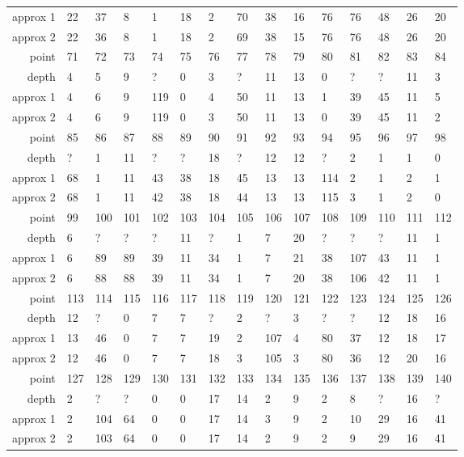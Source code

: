 \begin{center}
\begin{supertabular}{|r|l l l l l l l l l l l l l l|}
approx 1 & 22 & 37 & 8 & 1 & 18 & 2 & 70 & 38 & 16 & 76 & 76 & 48 & 26 & 20 \\
approx 2 & 22 & 36 & 8 & 1 & 18 & 2 & 69 & 38 & 15 & 76 & 76 & 48 & 26 & 20 \\
\hline
point & 71 & 72 & 73 & 74 & 75 & 76 & 77 & 78 & 79 & 80 & 81 & 82 & 83 & 84 \\
\hline
depth & 4 & 5 & 9 & ? & 0 & 3 & ? & 11 & 13 & 0 & ? & ? & 11 & 3 \\
approx 1 & 4 & 6 & 9 & 119 & 0 & 4 & 50 & 11 & 13 & 1 & 39 & 45 & 11 & 5 \\
approx 2 & 4 & 6 & 9 & 119 & 0 & 3 & 50 & 11 & 13 & 0 & 39 & 45 & 11 & 2 \\
\hline
point & 85 & 86 & 87 & 88 & 89 & 90 & 91 & 92 & 93 & 94 & 95 & 96 & 97 & 98 \\
\hline
depth & ? & 1 & 11 & ? & ? & 18 & ? & 12 & 12 & ? & 2 & 1 & 1 & 0 \\
approx 1 & 68 & 1 & 11 & 43 & 38 & 18 & 45 & 13 & 13 & 114 & 2 & 1 & 2 & 1 \\
approx 2 & 68 & 1 & 11 & 42 & 38 & 18 & 44 & 13 & 13 & 115 & 3 & 1 & 2 & 0 \\
\hline
point & 99 & 100 & 101 & 102 & 103 & 104 & 105 & 106 & 107 & 108 & 109 & 110 & 111 & 112 \\
\hline
depth & 6 & ? & ? & ? & 11 & ? & 1 & 7 & 20 & ? & ? & ? & 11 & 1 \\
approx 1 & 6 & 89 & 89 & 39 & 11 & 34 & 1 & 7 & 21 & 38 & 107 & 43 & 11 & 1 \\
approx 2 & 6 & 88 & 88 & 39 & 11 & 34 & 1 & 7 & 20 & 38 & 106 & 42 & 11 & 1 \\
\hline
point & 113 & 114 & 115 & 116 & 117 & 118 & 119 & 120 & 121 & 122 & 123 & 124 & 125 & 126 \\
\hline
depth & 12 & ? & 0 & 7 & 7 & ? & 2 & ? & 3 & ? & ? & 12 & 18 & 16 \\
approx 1 & 13 & 46 & 0 & 7 & 7 & 19 & 2 & 107 & 4 & 80 & 37 & 12 & 18 & 17 \\
approx 2 & 12 & 46 & 0 & 7 & 7 & 18 & 3 & 105 & 3 & 80 & 36 & 12 & 20 & 16 \\
\hline
point & 127 & 128 & 129 & 130 & 131 & 132 & 133 & 134 & 135 & 136 & 137 & 138 & 139 & 140 \\
\hline
depth & 2 & ? & ? & 0 & 0 & 17 & 14 & 2 & 9 & 2 & 8 & ? & 16 & ? \\
approx 1 & 2 & 104 & 64 & 0 & 0 & 17 & 14 & 3 & 9 & 2 & 10 & 29 & 16 & 41 \\
approx 2 & 2 & 103 & 64 & 0 & 0 & 17 & 14 & 2 & 9 & 2 & 9 & 29 & 16 & 41 \\

\end{supertabular}
\end{center}
